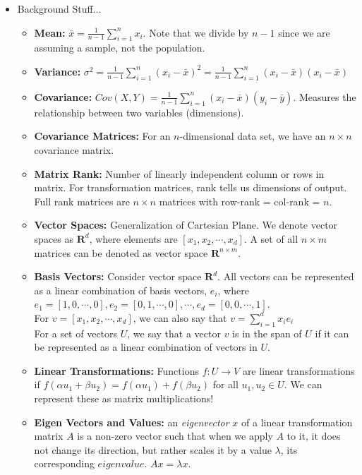 \documentclass{article}
\begin{document}
\newline
\newline
\begin{itemize}
    \item Background Stuff...
    \begin{itemize}
        \item \textbf{Mean:} $\bar{x} = \frac{1}{n-1}\sum^n_{i=1}x_i$. Note that we divide by $n-1$ since we are assuming a sample, not the population. 
        \item \textbf{Variance:} $\sigma^2 = \frac{1}{n-1}\sum^n_{i=1}(x_i-\bar{x})^2 = \frac{1}{n-1}\sum^n_{i=1}(x_i-\bar{x})(x_i-\bar{x})$
        \item \textbf{Covariance:} $Cov(X,Y) = \frac{1}{n-1}\sum^n_{i=1}(x_i-\bar{x})(y_i-\bar{y})$. Measures the relationship between two variables (dimensions).
        \item \textbf{Covariance Matrices:} For an $n$-dimensional data set, we have an $n\times n$ covariance matrix. 
        \item \textbf{Matrix Rank:} Number of linearly independent column or rows in matrix. For transformation matrices, rank tells us dimensions of output. Full rank matrices are $n\times n$ matrices with row-rank = col-rank = $n$.
        \item \textbf{Vector Spaces:} Generalization of Cartesian Plane. We denote vector spaces as $\mathbf{R}^d$, where elements are $[x_1,x_2,\cdots,x_d]$. A set of all $n\times m$ matrices can be denoted as vector space $\mathbf{R}^{n\times m}$.
        \item \textbf{Basis Vectors:} Consider vector space $\mathbf{R}^d$. All vectors can be represented as a linear combination of basis vectors, $e_i$, where\\ $e_1 = [1,0,\cdots,0], e_2 = [0,1,\cdots,0], \cdots, e_d = [0,0,\cdots,1]$.\\
        For $v = [x_1,x_2,\cdots,x_d]$, we can also say that $v = \sum^d_{i=1}x_ie_i$\\
        For a set of vectors $U$, we say that a vector $v$ is in the span of $U$ if it can be represented as a linear combination of vectors in $U$.
        \item \textbf{Linear Transformations:} Functions $f:U\rightarrow V$ are linear transformations if $f(\alpha u_1 + \beta u_2) = f(\alpha u_1) + f(\beta u_2)$ for all $u_1,u_2 \in U$. We can represent these as matrix multiplications!
        \item \textbf{Eigen Vectors and Values:} an \textit{eigenvector} $x$ of a linear transformation matrix $A$ is a non-zero vector such that when we apply $A$ to it, it does not change its direction, but rather scales it by a value $\lambda$, its corresponding $eigenvalue$. $Ax = \lambda x$. \\

\end{itemize}
\end{itemize}
\end{document}
